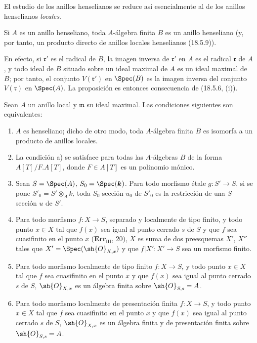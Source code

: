 El estudio de los anillos henselianos se reduce así esencialmente al de los anillos henselianos \emph{locales}.

\begin{proposition}[18.5.10]
\label{IV.18.5.10}
Si $A$ es un anillo henseliano, toda $A$-álgebra finita $B$ es un anillo henseliano \textup{(y, por tanto,} un producto directo de anillos locales henselianos \textup{(18.5.9))}.
\end{proposition}

En efecto, si $\mathfrak r'$ es el radical de $B$, la imagen inversa de $\mathfrak r'$ en $A$ es el radical $\mathfrak r$ de $A$, y todo ideal de $B$ situado sobre un ideal maximal de $A$ es un ideal maximal de $B$; por tanto, el conjunto $V(\mathfrak r')$ en $\Spec(B)$ es la imagen inversa del conjunto $V(\mathfrak r)$ en $\Spec(A)$. La proposición es entonces consecuencia de (18.5.6, (i)).

\begin{theorem}[18.5.11]
\label{IV.18.5.11}
Sean $A$ un anillo local y $\mathfrak m$ su ideal maximal. Las condiciones siguientes son equivalentes:
\begin{enumerate}
  \item[\textup{a)}] $A$ es henseliano; dicho de otro modo, toda $A$-álgebra finita $B$ es isomorfa a un producto de anillos locales.


  \item[\textup{a$'$)}] La condición \textup{a)} se satisface para todas las $A$-álgebras $B$ de la forma $A[T]/F.A[T]$, donde $F\in A[T]$ es un polinomio mónico.
  \item[\textup{b)}] Sean $S=\Spec(A)$, $S_0=\Spec(\boldsymbol k)$. Para todo morfismo étale $g:S'\to S$, si se pone $S'_0=S'\otimes_A k$, toda $S_0$-sección $u_0$ de $S'_0$ es la restricción de una $S$-sección $u$ de $S'$.
  \item[\textup{c)}] Para todo morfismo $f:X\to S$, separado y localmente de tipo finito, y todo punto $x\in X$ tal que $f(x)$ sea igual al punto cerrado $s$ de $S$ y que $f$ sea cuasifinito en el punto $x$ \textup{(\textbf{Err}$_{\mathrm{III}}$, 20)}, $X$ es suma de dos preesquemas $X'$, $X''$ tales que $X'=\Spec(\sh{O}_{X,x})$ y que $f|X':X'\to S$ sea un morfismo \textup{finito}.
  \item[\textup{c$'$)}] Para todo morfismo localmente de tipo finito $f:X\to S$, y todo punto $x\in X$ tal que $f$ sea cuasifinito en el punto $x$ y que $f(x)$ sea igual al punto cerrado $s$ de $S$, $\sh{O}_{X,x}$ es un álgebra finita sobre $\sh{O}_{S,s}=A$.
  \item[\textup{c$''$)}] Para todo morfismo localmente de presentación finita $f:X\to S$, y todo punto $x\in X$ tal que $f$ sea cuasifinito en el punto $x$ y que $f(x)$ sea igual al punto cerrado $s$ de $S$, $\sh{O}_{X,x}$ es un álgebra finita y de presentación finita sobre $\sh{O}_{S,s}=A$.
\end{enumerate}
\end{theorem}

